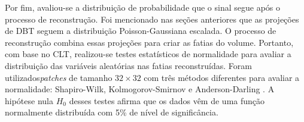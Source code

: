 Por fim, avaliou-se a distribuição de probabilidade que o sinal segue após o processo de reconstrução. Foi mencionado nas seções anteriores que as projeções de \acs{DBT} seguem a distribuição Poisson-Gaussiana escalada. O processo de reconstrução combina essas projeções para criar as fatias do volume. Portanto, com base no \acs{CLT}, realizou-se testes estatísticos de normalidade para avaliar a distribuição das variáveis aleatórias nas fatias reconstruídas. Foram utilizados\textit{patches} de tamanho $32\times32$ com três métodos diferentes para avaliar a normalidade: Shapiro-Wilk, Kolmogorov-Smirnov e Anderson-Darling \cite{razali2011power}. A hipótese nula $H_{0}$ desses testes afirma que os dados vêm de uma função normalmente distribuída com 5\% de nível de significância.






 